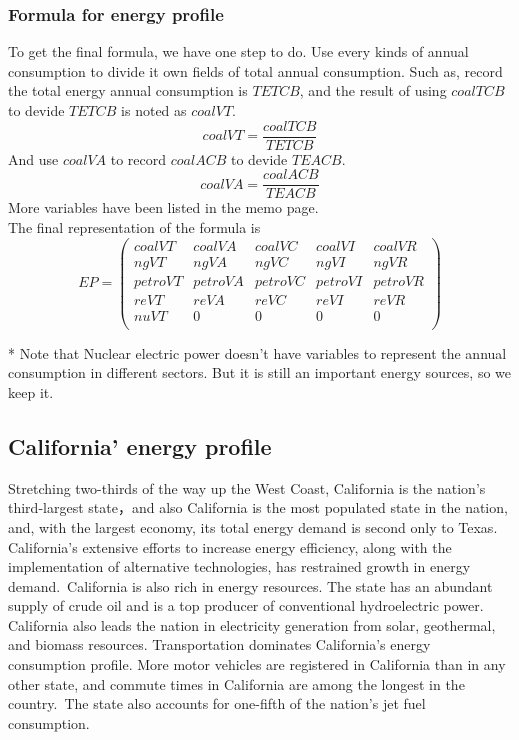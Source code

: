 \documentclass{mcmthesis}
\begin{document}
\subsubsection{Formula for energy profile}
To get the final formula, we have one step to do. Use every kinds of annual consumption to divide it own fields of total annual consumption.
Such as, record the total energy annual consumption is $TETCB$, and the result of using $coalTCB$ to devide $TETCB$ is noted as $coalVT$.
$$coalVT = \frac{coalTCB}{TETCB}$$
And use $coalVA$ to record $coalACB$ to devide $TEACB$.
$$coalVA = \frac{coalACB}{TEACB}$$
More variables have been listed in the memo page.\\
The final representation of the formula is
$$
  EP =
  \begin{pmatrix}
  coalVT & coalVA & coalVC & coalVI & coalVR  \\
  ngVT & ngVA & ngVC & ngVI & ngVR \\
  petroVT &　petroVA & petroVC & petroVI & petroVR \\
  reVT & reVA & reVC & reVI & reVR \\
  nuVT & 0 & 0 & 0 & 0\\
  \end{pmatrix}
$$

* Note that Nuclear electric power doesn't have variables to represent the annual consumption in different sectors.
But it is still an important energy sources, so we keep it.

\subsection{California' energy profile}
Stretching two-thirds of the way up the West Coast, California is the nation's third-largest state，and also California is the most populated state in the nation, and, with the largest economy, its total energy demand is second only to Texas. California's extensive efforts to increase energy efficiency, along with the implementation of alternative technologies, has restrained growth in energy demand. California is also rich in energy resources. The state has an abundant supply of crude oil and is a top producer of conventional hydroelectric power. California also leads the nation in electricity generation from solar, geothermal, and biomass resources. Transportation dominates California's energy consumption profile. More motor vehicles are registered in California than in any other state, and commute times in California are among the longest in the country. The state also accounts for one-fifth of the nation's jet fuel consumption.
\end{document}
